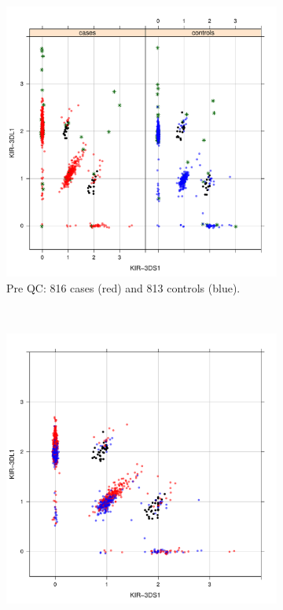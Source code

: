 \documentclass[12pt,a4paper,twoside]{article}
\begin{document}
\begin{figure}[h]
    \centering
    \begin{subfigure}[b]{.4\textwidth}
        \includegraphics[scale=.4] {figures/qc1.pdf}
        \caption{Pre QC: 816 cases (red) and 813 controls (blue).}
    \end{subfigure}
    ~
    \begin{subfigure}[b]{.4\textwidth}
        \includegraphics[scale=.4] {figures/qc4.pdf}

\end{subfigure}
\end{figure}
\end{document}
